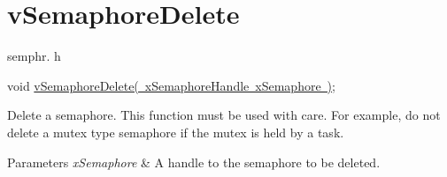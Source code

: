 \hypertarget{group__v_semaphore_delete}{}\section{v\+Semaphore\+Delete}
\label{group__v_semaphore_delete}
semphr. h 
\begin{DoxyPre}void \mbox{\hyperlink{semphr_8h_acd7d0eda0923d7caeeaaee9202c43eab}{vSemaphoreDelete( xSemaphoreHandle xSemaphore )}};\end{DoxyPre}


Delete a semaphore. This function must be used with care. For example, do not delete a mutex type semaphore if the mutex is held by a task.


\begin{DoxyParams}{Parameters}
{\em x\+Semaphore} & A handle to the semaphore to be deleted. \\
\hline
\end{DoxyParams}
